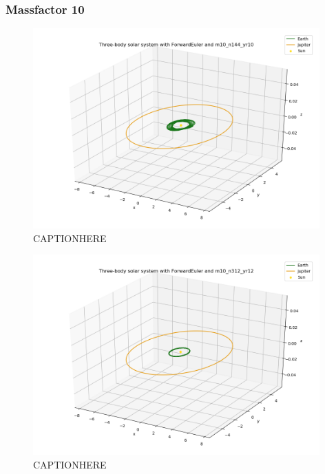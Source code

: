 \documentclass{article}
\begin{document}
\subsubsection{Massfactor 10}

    \begin{figure}[H]
        \centering
        \includegraphics[width = 11cm]{img/plot3D_S_E_J_F_m10_n144_yr10.png}
        \caption{CAPTIONHERE}
        \label{fig:plot3D_S_E_J_F_m10_n144_yr10}
    \end{figure}

    \begin{figure}[H]
        \centering
        \includegraphics[width = 11cm]{img/plot3D_S_E_J_F_m10_n312_yr12.png}
        \caption{CAPTIONHERE}
        \label{fig:plot3D_S_E_J_F_m10_n312_yr12}
    \end{figure}
\end{document}
